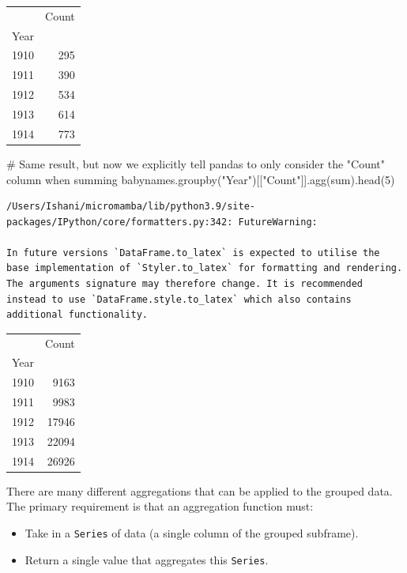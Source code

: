 \documentclass[
  letterpaper,
  DIV=11,
  numbers=noendperiod]{scrreprt}
\newenvironment{Shaded}{\begin{snugshade}}{\end{snugshade}}
\newcommand{\BuiltInTok}[1]{\textcolor[rgb]{0.00,0.23,0.31}{#1}}
\newcommand{\CommentTok}[1]{\textcolor[rgb]{0.37,0.37,0.37}{#1}}
\newcommand{\DecValTok}[1]{\textcolor[rgb]{0.68,0.00,0.00}{#1}}
\newcommand{\NormalTok}[1]{\textcolor[rgb]{0.00,0.23,0.31}{#1}}
\newcommand{\StringTok}[1]{\textcolor[rgb]{0.13,0.47,0.30}{#1}}
\providecommand{\tightlist}{%
  \setlength{\itemsep}{0pt}\setlength{\parskip}{0pt}}\usepackage{longtable,booktabs,array}
\begin{document}
\begin{tabular}{lr}
\toprule
{} &  Count \\
Year &        \\
\midrule
1910 &    295 \\
1911 &    390 \\
1912 &    534 \\
1913 &    614 \\
1914 &    773 \\
\bottomrule
\end{tabular}

\begin{Shaded}
\begin{Highlighting}[]
\CommentTok{\# Same result, but now we explicitly tell pandas to only consider the "Count" column when summing}
\NormalTok{babynames.groupby(}\StringTok{"Year"}\NormalTok{)[[}\StringTok{"Count"}\NormalTok{]].agg(}\BuiltInTok{sum}\NormalTok{).head(}\DecValTok{5}\NormalTok{)}
\end{Highlighting}
\end{Shaded}

\begin{verbatim}
/Users/Ishani/micromamba/lib/python3.9/site-packages/IPython/core/formatters.py:342: FutureWarning:

In future versions `DataFrame.to_latex` is expected to utilise the base implementation of `Styler.to_latex` for formatting and rendering. The arguments signature may therefore change. It is recommended instead to use `DataFrame.style.to_latex` which also contains additional functionality.
\end{verbatim}

\begin{tabular}{lr}
\toprule
{} &  Count \\
Year &        \\
\midrule
1910 &   9163 \\
1911 &   9983 \\
1912 &  17946 \\
1913 &  22094 \\
1914 &  26926 \\
\bottomrule
\end{tabular}

There are many different aggregations that can be applied to the grouped
data. The primary requirement is that an aggregation function must:

\begin{itemize}
\tightlist
\item
  Take in a \texttt{Series} of data (a single column of the grouped
  subframe).
\item
  Return a single value that aggregates this \texttt{Series}.
\end{itemize}
\end{document}
